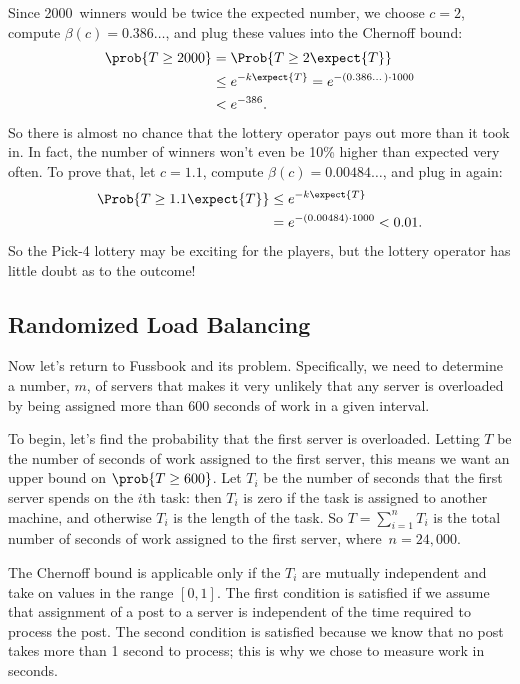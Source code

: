 Since 2000~winners would be twice the expected number, we choose $c =
2$, compute $\beta(c) = 0.386\dots$, and plug these values
into the Chernoff bound:
\begin{align*}
\prob{T \geq 2000} & = \Prob{T \geq 2 \expect{T}} \\
  & \leq e^{-k \expect{T}} = e^{- (0.386\dots) \cdot 1000} \\
  & < e^{-386}.
\end{align*}
So there is almost no chance that the lottery operator pays out more
than it took in.  In fact, the number of winners won't even be 10\%
higher than expected very often.  To prove that, let $c = 1.1$,
compute $\beta(c) = 0.00484\dots$, and plug in again:
\begin{align*}
\Prob{T \geq 1.1 \expect{T}} & \leq e^{-k \expect{T}} \\
  & = e^{- (0.00484)\cdot 1000} < 0.01.
\end{align*}
So the Pick-4 lottery may be exciting for the players, but the lottery
operator has little doubt as to the outcome!

\subsection{Randomized Load Balancing}\label{sec:load_balancing}

Now let's return to Fussbook and its  problem.
Specifically, we need to determine a number, $m$, of servers that
makes it very unlikely that any server is overloaded by being assigned
more than 600 seconds of work in a given interval.

To begin, let's find the probability that the first server is
overloaded.  Letting $T$ be the number of seconds of work assigned to
the first server, this means we want an upper bound on $\prob{T \geq
  600}$.  Let $T_i$ be the number of seconds that the first server
spends on the $i$th task: then $T_i$ is zero if the task is assigned
to another machine, and otherwise $T_i$ is the length of the task.  So
$T = \sum_{i = 1}^n T_i$ is the total number of seconds of work
assigned to the first server, where~$n = 24{,}000$.

The Chernoff bound is applicable only if the $T_i$ are mutually
independent and take on values in the range $[0, 1]$.  The first
condition is satisfied if we assume that assignment of a post to a
server is independent of the time required to process the post.  The
second condition is satisfied because we know that no post takes more
than 1 second to process; this is why we chose to measure work in
seconds.

